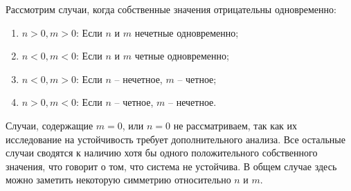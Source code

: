 \begin{enumerate}
				Рассмотрим случаи, когда собственные значения отрицательны одновременно:
				\begin{enumerate}
					\item $n > 0, m > 0$: Если $n$ и $m$ нечетные одновременно;
					\item $n < 0, m < 0$: Если $n$ и $m$ четные одновременно;
					\item $n < 0, m > 0$: Если $n$ -- нечетное, $m$ -- четное;
					\item $n > 0, m < 0$: Если $n$ -- четное, $m$ -- нечетное.
				\end{enumerate}
				Случаи, содержащие $m = 0$, или $n = 0$ не рассматриваем, так как их исследование на устойчивость требует дополнительного анализа. Все остальные случаи сводятся к наличию хотя бы одного положительного собственного значения, что говорит о том, что система не устойчива. В общем случае здесь можно заметить некоторую симметрию относительно $n$ и $m$.

		\end{enumerate}


